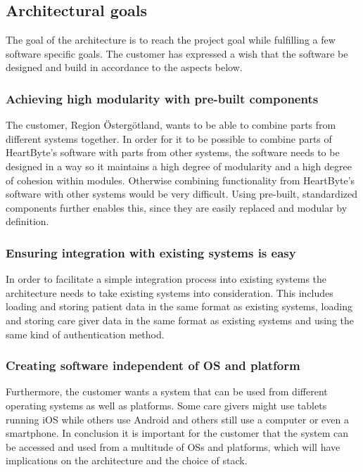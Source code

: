 \documentclass{article}
\begin{document}
\subsection{Architectural goals}
The goal of the architecture is to reach the project goal while fulfilling a few software specific goals. The customer has expressed a wish that the software be designed and build in accordance to the aspects below.

\subsubsection{Achieving high modularity with pre-built components}
The customer, Region Östergötland, wants to be able to combine parts from different systems together. In order for it to be possible to combine parts of HeartByte's software with parts from other systems, the software needs to be designed in a way so it maintains a high degree of modularity and a high degree of cohesion within modules. Otherwise combining functionality from HeartByte's software with other systems would be very difficult. Using pre-built, standardized components further enables this, since they are easily replaced and modular by definition.

\subsubsection{Ensuring integration with existing systems is easy}
In order to facilitate a simple integration process into existing systems the architecture needs to take existing systems into consideration. This includes loading and storing patient data in the same format as existing systems, loading and storing care giver data in the same format as existing systems and using the same kind of authentication method.

\subsubsection{Creating software independent of OS and platform}
Furthermore, the customer wants a system that can be used from different operating systems as well as platforms. Some care givers might use tablets running iOS while others use Android and others still use a computer or even a smartphone. In conclusion it is important for the customer that the system can be accessed and used from a multitude of OSs and platforms, which will have implications on the architecture and the choice of stack. 
\end{document}
